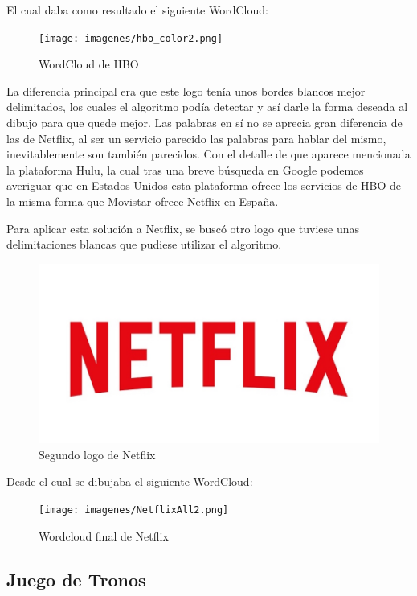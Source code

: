 El cual daba como resultado el siguiente WordCloud: 

\begin{figure}[h]
	\centering
	\texttt{[image: imagenes/hbo\_color2.png]}
	\caption{WordCloud de HBO}
	\label{fig:wordcloudHBO}
\end{figure} 

La diferencia principal era que este logo tenía unos bordes blancos mejor delimitados, los cuales el algoritmo podía detectar y así darle la forma deseada al dibujo para que quede mejor. Las palabras en sí no se aprecia gran diferencia de las de Netflix, al ser un servicio parecido las palabras para hablar del mismo, inevitablemente son también parecidos. Con el detalle de que aparece mencionada la plataforma Hulu, la cual tras una breve búsqueda en Google podemos averiguar que en Estados Unidos esta plataforma ofrece los servicios de HBO de la misma forma que Movistar ofrece Netflix en España. 

Para aplicar esta solución a Netflix, se buscó otro logo que tuviese unas delimitaciones blancas que pudiese utilizar el algoritmo. 

\begin{figure}[H]
	\centering
	\includegraphics[scale=.35]{imagenes/netf.jpeg}
	\caption{Segundo logo de Netflix}
	\label{fig:logonetflix2}
\end{figure} 

Desde el cual se dibujaba el siguiente WordCloud: 

\begin{figure}[H]
	\centering
	\texttt{[image: imagenes/NetflixAll2.png]}
	\caption{Wordcloud final de Netflix}
	\label{fig:wordcloudNetflix}
\end{figure} 




\subsection{Juego de Tronos}

